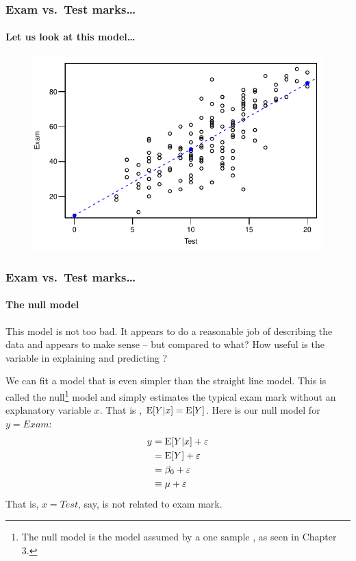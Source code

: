 \documentclass{beamer}\usepackage[]{graphicx}\usepackage[]{xcolor}
\begin{document}
\begin{frame}[fragile]
\frametitle{Exam vs.\ Test marks\ldots}
\framesubtitle{Let us look at this model\ldots}



\begin{figure}
  \centering
  \includegraphics{figure/RC-H01-019}
\end{figure}

\end{frame}




\begin{frame}[fragile]
\frametitle{Exam vs.\ Test marks\ldots}
\framesubtitle{The null model}
This model is not too bad. It appears to do a reasonable job of describing the data and appears to make sense -- but compared to what? How useful is the variable   in explaining and predicting ?

We can fit a model that is even simpler than the straight line model. This is called the null\footnote{The null model is the model assumed by a one sample \ttest{}, as seen in Chapter 3.} model and simply estimates the  typical exam mark without an explanatory variable $x$. That is , $\operatorname{E}[Y|x]=\operatorname{E}[Y]$. Here is our null model for $y=Exam$: 
\vspace{-0.5em}
\begin{align*}
y &=\operatorname{E}[Y|x]+\varepsilon\\
  &=\operatorname{E}[Y] +\varepsilon\\
  &=\beta_0+\varepsilon\\
  &\equiv \mu+\varepsilon
\end{align*}
That is, $x=Test$, say, is not related to exam mark.

\end{frame}
\end{document}

